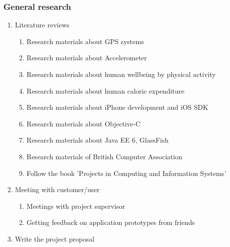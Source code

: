 \documentclass[12pt, a4paper]{report}   %
\begin{document}
\subsubsection{General research}
\begin{enumerate}
	\item Literature reviews
		\begin{enumerate}
			\item Research materials about GPS systems
			\item Research materials about Accelerometer
			\item Research materials about human wellbeing by physical activity
			\item Research materials about human caloric expenditure
			\item Research materials about iPhone development and iOS SDK
			\item Research materials about Objective-C
			\item Research materials about Java EE 6, GlassFish  
			\item Research materials of British Computer Association
			\item Follow the book 'Projects in Computing and Information Systems'
		\end{enumerate}
	\item Meeting with customer/user
		\begin{enumerate}
			\item Meetings with project supervisor
			\item Getting feedback on application prototypes from friends
		\end{enumerate}
	\item Write the project proposal
\end{enumerate}


\end{document}
